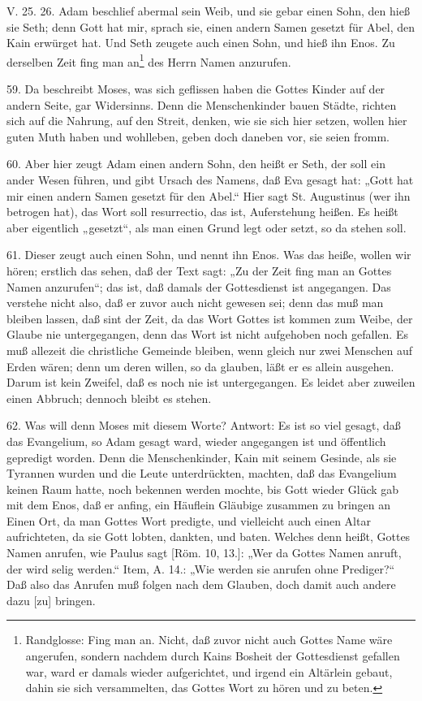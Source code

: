 V. 25. 26. Adam beschlief abermal sein Weib, und sie gebar einen Sohn, den hieß sie Seth; denn Gott hat mir, sprach sie, einen andern Samen gesetzt für Abel, den Kain erwürget hat. Und Seth zeugete auch einen Sohn, und hieß ihn Enos. Zu derselben Zeit fing man an\footnote{Randglosse: Fing man an. Nicht, daß zuvor nicht auch Gottes Name wäre angerufen, sondern nachdem durch Kains Bosheit der Gottesdienst gefallen war, ward er damals wieder aufgerichtet, und irgend ein Altärlein gebaut, dahin sie sich versammelten, das Gottes Wort zu hören und zu beten.} des Herrn Namen anzurufen.

59. Da beschreibt Moses, was sich geflissen haben die Gottes Kinder auf der andern Seite, gar Widersinns. Denn die Menschenkinder bauen Städte, richten sich auf die Nahrung, auf den Streit, denken, wie sie sich hier setzen, wollen hier guten Muth haben und wohlleben, geben doch daneben vor, sie seien fromm.

60. Aber hier zeugt Adam einen andern Sohn, den heißt er Seth, der soll ein ander Wesen führen, und gibt Ursach des Namens, daß Eva gesagt hat: „Gott hat mir einen andern Samen gesetzt für den Abel.“ Hier sagt St. Augustinus (wer ihn betrogen hat), das Wort soll resurrectio, das ist, Auferstehung heißen. Es heißt aber eigentlich „gesetzt“, als man einen Grund legt oder setzt, so da stehen soll.

61. Dieser zeugt auch einen Sohn, und nennt ihn Enos. Was das heiße, wollen wir hören; erstlich das sehen, daß der Text sagt: „Zu der Zeit fing man an Gottes Namen anzurufen“; das ist, daß damals der Gottesdienst ist angegangen. Das verstehe nicht also, daß er zuvor auch nicht gewesen sei; denn das muß man bleiben lassen, daß sint der Zeit, da das Wort Gottes ist kommen zum Weibe, der Glaube nie untergegangen, denn das Wort ist nicht aufgehoben noch gefallen. Es muß allezeit die christliche Gemeinde bleiben, wenn gleich nur zwei Menschen auf Erden wären; denn um deren willen, so da glauben, läßt er es allein ausgehen. Darum ist kein Zweifel, daß es noch nie ist untergegangen. Es leidet aber zuweilen einen Abbruch; dennoch bleibt es stehen.

62. Was will denn Moses mit diesem Worte? Antwort: Es ist so viel gesagt, daß das Evangelium, so Adam gesagt ward, wieder angegangen ist und öffentlich gepredigt worden. Denn die Menschenkinder, Kain mit seinem Gesinde, als sie Tyrannen wurden und die Leute unterdrückten, machten, daß das Evangelium keinen Raum hatte, noch bekennen werden mochte, bis Gott wieder Glück gab mit dem Enos, daß er anfing, ein Häuflein Gläubige zusammen zu bringen an Einen Ort, da man Gottes Wort predigte, und vielleicht auch einen Altar aufrichteten, da sie Gott lobten, dankten, und baten. Welches denn heißt, Gottes Namen anrufen, wie Paulus sagt [Röm. 10, 13.]: „Wer da Gottes Namen anruft, der wird selig werden.“ Item, A. 14.: „Wie werden sie anrufen ohne Prediger?“ Daß also das Anrufen muß folgen nach dem Glauben, doch damit auch andere dazu [zu] bringen.

